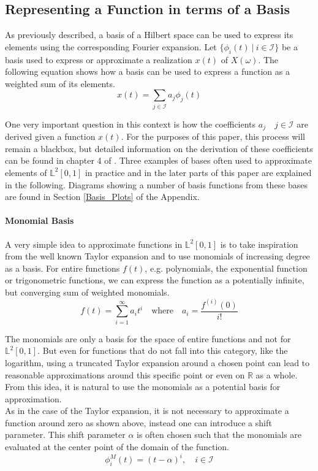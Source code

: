 \documentclass[11pt,twoside,a4paper]{article}
\begin{document}
	\subsection{Representing a Function in terms of a Basis}\label{bases}
	As previously described, a basis of a Hilbert space can be used to express its elements using the corresponding Fourier expansion. Let $\{\phi_i(t) \: \vert \: i \in \mathcal{I}\}$ be a basis used to express or approximate a realization $x(t)$ of $X(\omega)$. The following equation shows how a basis can be used to express a function as a weighted sum of its elements.
	\begin{equation}
		x(t) = \sum_{j \in \mathcal{I}} a_j \phi_j(t) 
	\end{equation}
	
	One very important question in this context is how the coefficients $a_j \quad j \in \mathcal{I}$ are derived given a function $x(t)$. For the purposes of this paper, this process will remain a blackbox, but detailed information on the derivation of these coefficients can be found in chapter 4 of \cite{ramsay_functional_2005}.
	Three examples of bases often used to approximate elements of $\mathbb{L}^2[0,1]$ in practice and in the later parts of this paper are explained in the following. Diagrams showing a number of basis functions from these bases are found in Section \ref{Basis_Plots} of the Appendix.
	\vspace{-0.2cm}
	
	\paragraph{Monomial Basis}\label{Monomial_basis}
	A very simple idea to approximate functions in $\mathbb{L}^2[0,1]$ is to take inspiration from the well known Taylor expansion and to use monomials of increasing degree as a basis. For entire functions $f(t)$, e.g. polynomials, the exponential function or trigonometric functions, we can express the function as a potentially infinite, but converging sum of weighted monomials.
	\begin{equation}\label{Taylor_expansion}
		f(t) = \sum_{i = 1}^{\infty}a_i t^i \quad \text{where} \quad a_i = \frac{f^{(i)}(0)}{i!}
	\end{equation}
	
	The monomials are only a basis for the space of entire functions and not for $\mathbb{L}^2[0,1]$. But even for functions that do not fall into this category, like the logarithm, using a truncated Taylor expansion around a chosen point can lead to reasonable approximations around this specific point or even on $\mathbb{R}$ as a whole. From this idea, it is natural to use the monomials as a potential basis for approximation. \\
	As in the case of the Taylor expansion, it is not necessary to approximate a function around zero as shown above, instead one can introduce a shift parameter. This shift parameter $\alpha$ is often chosen such that the monomials are evaluated at the center point of the domain of the function.
	\begin{equation}
		\phi_{i}^{M}(t) = (t-\alpha)^i, \quad i \in \mathcal{I}
	\end{equation}
\end{document}
